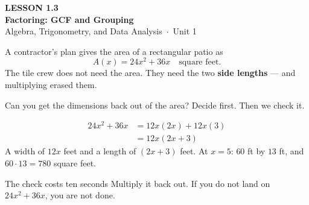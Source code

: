 \documentclass[aspectratio=169, 11pt]{beamer}
\begin{document}
{
\begin{frame}[plain]
  \vspace{2.8cm}\hspace{0.55cm}%
  \begin{minipage}{0.9\textwidth}
    {\color{goldacc}\bfseries\small LESSON 1.3}\\[0.5cm]
    {\color{white}\bfseries\LARGE Factoring: GCF and Grouping}\\[1.2cm]
    {\color{mistmid}\small Algebra, Trigonometry, and Data Analysis~$\cdot$~Unit 1}
  \end{minipage}
\end{frame}
}

\begin{frame}[t, plain]
  A contractor's plan gives the area of a rectangular patio as
  \[ A(x) = 24x^2+36x \quad \text{square feet.} \]
  The tile crew does not need the area. They need the two \textbf{side lengths} --- and
  multiplying erased them.
  \begin{block}{Can you get the dimensions back out of the area?}
    Decide first. Then we check it.
  \end{block}
\end{frame}

\begin{frame}[t, plain]
  \[
  \begin{aligned}
    24x^2+36x &= 12x(2x) + 12x(3) \\
              &= 12x(2x+3)
  \end{aligned}
  \]
  A width of $12x$ feet and a length of $(2x+3)$ feet. At $x=5$: $60$ ft by $13$ ft, and
  $60 \cdot 13 = 780$ square feet.
  \begin{block}{The check costs ten seconds}
    Multiply it back out. If you do not land on $24x^2+36x$, you are not done.
  \end{block}
\end{frame}
\end{document}
